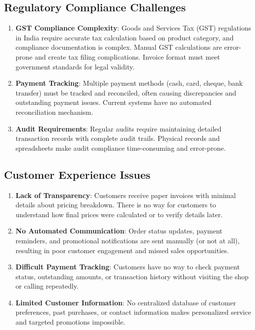 \documentclass[12pt,a4paper]{report}
\begin{document}
\subsection{Regulatory Compliance Challenges}
\begin{enumerate}[label=\roman*)]
    \item \textbf{GST Compliance Complexity}: Goods and Services Tax (GST) regulations in India require accurate tax calculation based on product category, and compliance documentation is complex. Manual GST calculations are error-prone and create tax filing complications. Invoice format must meet government standards for legal validity.
    \item \textbf{Payment Tracking}: Multiple payment methods (cash, card, cheque, bank transfer) must be tracked and reconciled, often causing discrepancies and outstanding payment issues. Current systems have no automated reconciliation mechanism.
    \item \textbf{Audit Requirements}: Regular audits require maintaining detailed transaction records with complete audit trails. Physical records and spreadsheets make audit compliance time-consuming and error-prone.
\end{enumerate}

\subsection{Customer Experience Issues}
\begin{enumerate}[label=\roman*)]
    \item \textbf{Lack of Transparency}: Customers receive paper invoices with minimal details about pricing breakdown. There is no way for customers to understand how final prices were calculated or to verify details later.
    \item \textbf{No Automated Communication}: Order status updates, payment reminders, and promotional notifications are sent manually (or not at all), resulting in poor customer engagement and missed sales opportunities.
    \item \textbf{Difficult Payment Tracking}: Customers have no way to check payment status, outstanding amounts, or transaction history without visiting the shop or calling repeatedly.
    \item \textbf{Limited Customer Information}: No centralized database of customer preferences, past purchases, or contact information makes personalized service and targeted promotions impossible.
\end{enumerate}
\end{document}
